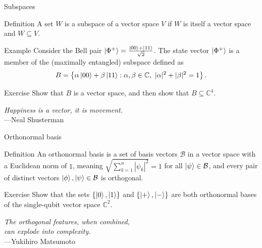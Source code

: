 \documentclass{beamer}
\newcommand{\C}{\mathbb{C}}
\newcommand{\B}{\mathcal B}
\begin{document}
\begin{frame}{Subspaces}
    \begin{block}{Definition}
        A set $W$ is a subspace of a vector space $V$ if $W$ is itself a vector space and $W\subseteq V$.
    \end{block}
    \begin{block}{Example}
        Consider the Bell pair $ \ket{\Phi^+}= \frac{\ket{00} + \ket{11}}{\sqrt2} $. The state vector $\ket{\Phi^+}$ is a member of the (maximally entangled) subspace defined as
        $$ B= \left\{ \alpha\ket{00} + \beta\ket{11} : \alpha,\beta \in \C,\text{ } |\alpha|^2 + |\beta|^2 = 1 \right\}. $$
    \end{block}
    \begin{block}{Exercise}
        Show that $B$ is a vector space, and then show that $B\subseteq \C^4$.
    \end{block}
    \begin{flushright}
        \textit{Happiness is a vector, it is movement.}\\---Neal Shusterman
    \end{flushright}
\end{frame}


\begin{frame}{Orthonormal basis}

\begin{block}{Definition}
    An orthonormal basis is a set of basis vectors $\B$ in a vector space with a Euclidean norm of $1$, meaning $\sqrt{\sum_{k=1}^n |\psi_k|^2} = 1$ for all $\ket\psi \in \B$, and every pair of distinct vectors $\ket\phi,\ket\psi \in \B$ is orthogonal.
\end{block}

\begin{block}{Exercise}
    Show that the sets $\{ \ket0 ,\ket1 \}$ and $ \{ \ket+, \ket-\}$ are both orthonormal bases of the single-qubit vector space $\C^2$.
\end{block}

\begin{flushright}
    \textit{The orthogonal features, when combined,\\can explode into complexity.}\\---Yukihiro Matsumoto
\end{flushright}

\end{frame}
\end{document}
